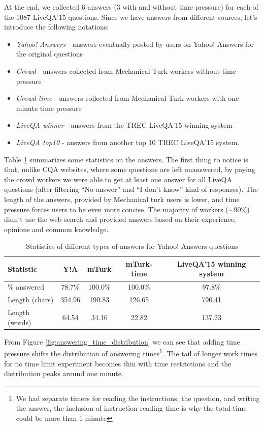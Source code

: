 At the end, we collected 6 answers (3 with and without time pressure) for each of the 1087 LiveQA'15 questions.
Since we have answers from different sources, let's introduce the following notations:
\begin{itemize}
	\item \textit{Yahoo! Answers} - answers eventually posted by users on Yahoo! Answers for the original questions
	\item \textit{Crowd} - answers collected from Mechanical Turk workers without time pressure
	\item \textit{Crowd-time} - answers collected from Mechanical Turk workers with one minute time pressure
	\item \textit{LiveQA winner} - answers from the TREC LiveQA'15 winning system
	\item \textit{LiveQA top10} - answers from another top 10 TREC LiveQA'15 system.
\end{itemize}

Table \ref{table:crowdsourcing:answer_stats} summarizes some statistics on the answers.
The first thing to notice is that, unlike CQA websites, where some questions are left unanswered, by paying the crowd workers we were able to get at least one answer for all LiveQA questions (after filtering ``No answer'' and ``I don't know'' kind of responses).
The length of the answers, provided by Mechanical turk users is lower, and time pressure forces users to be even more concise.
The majority of workers ($\sim90 \%$) didn't use the web search and provided answers based on their experience, opinions and common knowledge.

\begin{table}[ht]
\centering
\begin{tabular}{| p{3cm} | c | c | c | c |}
\hline
Statistic & Y!A & mTurk & mTurk-time & LiveQA'15 winning system\\
\hline
\% answered & 78.7\% & 100.0\% & 100.0\% & 97.8\% \\
Length (chars) & 354.96 & 190.83 & 126.65 & 790.41 \\
Length (words) & 64.54 & 34.16 & 22.82 & 137.23 \\
\hline
\end{tabular}
\caption{Statistics of different types of answers for Yahoo! Answers questions}
\label{table:crowdsourcing:answer_stats}
\end{table}

From Figure \ref{fig:answering_time_distribution} we can see that adding time pressure shifts the distribution of answering times\footnote{We had separate timers for reading the instructions, the question, and writing the answer, the inclusion of instruction-reading time is why the total time could be more than 1 minute}.
The tail of longer work times for no time limit experiment becomes thin with time restrictions and the distribution peaks around one minute.

